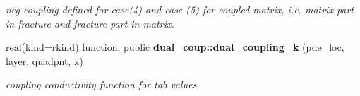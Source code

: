 \begin{DoxyCompactItemize}
\begin{DoxyCompactList}\small\item\em neg coupling defined for case(4) and case (5) for coupled matrix, i.\+e. matrix part in fracture and fracture part in matrix. \end{DoxyCompactList}\item 
real(kind=rkind) function, public {\bf dual\+\_\+coup\+::dual\+\_\+coupling\+\_\+k} (pde\+\_\+loc, layer, quadpnt, x)
\begin{DoxyCompactList}\small\item\em coupling conductivity function for tab values \end{DoxyCompactList}\end{DoxyCompactItemize}
